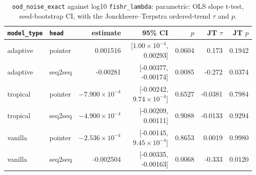 \documentclass[10pt]{article}
\begin{document}
{\small
\begin{longtable}{llrrrrr}
\caption{\texttt{ood\_noise\_exact} against log10 \texttt{fishr\_lambda}: parametric: OLS slope t-test, seed-bootstrap CI, with the Jonckheere--Terpstra ordered-trend $\tau$ and $p$.}\label{tab:trend-ood_noise_exact}\\
\toprule
\texttt{model\_type} & \texttt{head} & estimate & 95\% CI & $p$ & JT $\tau$ & JT $p$\\
\midrule
\endhead
adaptive & pointer & 0.001516 & [$1.00\times10^{-4}$, 0.00293] & 0.0604 & 0.173 & 0.1942\\
adaptive & seq2seq & -0.00281 & [-0.00377, -0.00174] & 0.0085 & -0.272 & 0.0374\\
tropical & pointer & $-7.900\times10^{-4}$ & [-0.00242, $9.74\times10^{-4}$] & 0.6527 & -0.0381 & 0.7984\\
tropical & seq2seq & $-4.900\times10^{-4}$ & [-0.00209, 0.00111] & 0.9088 & -0.0133 & 0.9294\\
vanilla & pointer & $-2.536\times10^{-4}$ & [-0.00145, $9.45\times10^{-4}$] & 0.8653 & 0.0019 & 0.9980\\
vanilla & seq2seq & -0.002504 & [-0.00335, -0.00163] & 0.0068 & -0.333 & 0.0120\\
\bottomrule
\end{longtable}
}
\end{document}
